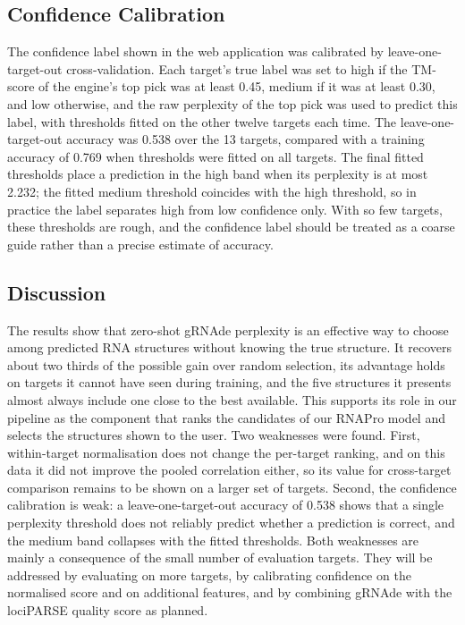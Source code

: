 \documentclass{FastFyp}
\begin{document}
\subsection{Confidence Calibration}
The confidence label shown in the web application was calibrated by leave-one-target-out cross-validation. Each target's true label was set to high if the TM-score of the engine's top pick was at least 0.45, medium if it was at least 0.30, and low otherwise, and the raw perplexity of the top pick was used to predict this label, with thresholds fitted on the other twelve targets each time. The leave-one-target-out accuracy was 0.538 over the 13 targets, compared with a training accuracy of 0.769 when thresholds were fitted on all targets. The final fitted thresholds place a prediction in the high band when its perplexity is at most 2.232; the fitted medium threshold coincides with the high threshold, so in practice the label separates high from low confidence only. With so few targets, these thresholds are rough, and the confidence label should be treated as a coarse guide rather than a precise estimate of accuracy.

\subsection{Discussion}
The results show that zero-shot gRNAde perplexity is an effective way to choose among predicted RNA structures without knowing the true structure. It recovers about two thirds of the possible gain over random selection, its advantage holds on targets it cannot have seen during training, and the five structures it presents almost always include one close to the best available. This supports its role in our pipeline as the component that ranks the candidates of our RNAPro model and selects the structures shown to the user. Two weaknesses were found. First, within-target normalisation does not change the per-target ranking, and on this data it did not improve the pooled correlation either, so its value for cross-target comparison remains to be shown on a larger set of targets. Second, the confidence calibration is weak: a leave-one-target-out accuracy of 0.538 shows that a single perplexity threshold does not reliably predict whether a prediction is correct, and the medium band collapses with the fitted thresholds. Both weaknesses are mainly a consequence of the small number of evaluation targets. They will be addressed by evaluating on more targets, by calibrating confidence on the normalised score and on additional features, and by combining gRNAde with the lociPARSE quality score as planned.
\end{document}
